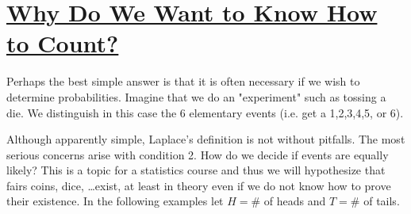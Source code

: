 \documentclass[12pt, letterpaper, onecolumn, conference, final]{IEEEtran}
\theoremstyle{definition}
\newtheorem{definition}{Definition}[section]
\theoremstyle{plain}
\begin{document}
\vspace{.3cm}
\section{\textbf{\underline{Why Do We Want to Know How to Count?}}}
\vspace{.3cm}
\noindent
Perhaps the best simple answer is that it is often necessary if we wish to determine probabilities. Imagine that we do an "experiment" such as tossing a die. We distinguish in this case the 6 elementary events (i.e. get a 1,2,3,4,5, or 6).

\begin{center}
\end{center}

\noindent
Although apparently simple, Laplace's definition is not without pitfalls. The most serious concerns arise with condition 2. How do we decide if events are equally likely? This is a topic for a statistics course and thus we will hypothesize that fairs coins, dice, \dots exist, at least in theory even if we do not know how to prove their existence. In the following examples let $H = \#$ of heads and $T = \#$ of tails.
\end{document}
